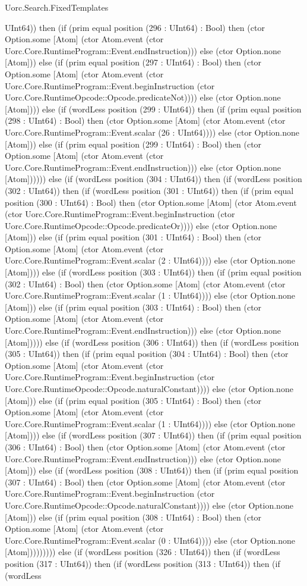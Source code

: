 \begin{lexlean}{Uorc.Search.FixedTemplates}
\begin{semanticmodule}
{UInt64)) then (if (prim equal position (296 : UInt64) : Bool) then (ctor Option.some [Atom] (ctor Atom.event (ctor Uorc.Core.RuntimeProgram::Event.endInstruction))) else (ctor Option.none [Atom])) else (if (prim equal position (297 : UInt64) : Bool) then (ctor Option.some [Atom] (ctor Atom.event (ctor Uorc.Core.RuntimeProgram::Event.beginInstruction (ctor Uorc.Core.RuntimeOpcode::Opcode.predicateNot)))) else (ctor Option.none [Atom]))) else (if (wordLess position (299 : UInt64)) then (if (prim equal position (298 : UInt64) : Bool) then (ctor Option.some [Atom] (ctor Atom.event (ctor Uorc.Core.RuntimeProgram::Event.scalar (26 : UInt64)))) else (ctor Option.none [Atom])) else (if (prim equal position (299 : UInt64) : Bool) then (ctor Option.some [Atom] (ctor Atom.event (ctor Uorc.Core.RuntimeProgram::Event.endInstruction))) else (ctor Option.none [Atom]))))) else (if (wordLess position (304 : UInt64)) then (if (wordLess position (302 : UInt64)) then (if (wordLess position (301 : UInt64)) then (if (prim equal position (300 : UInt64) : Bool) then (ctor Option.some [Atom] (ctor Atom.event (ctor Uorc.Core.RuntimeProgram::Event.beginInstruction (ctor Uorc.Core.RuntimeOpcode::Opcode.predicateOr)))) else (ctor Option.none [Atom])) else (if (prim equal position (301 : UInt64) : Bool) then (ctor Option.some [Atom] (ctor Atom.event (ctor Uorc.Core.RuntimeProgram::Event.scalar (2 : UInt64)))) else (ctor Option.none [Atom]))) else (if (wordLess position (303 : UInt64)) then (if (prim equal position (302 : UInt64) : Bool) then (ctor Option.some [Atom] (ctor Atom.event (ctor Uorc.Core.RuntimeProgram::Event.scalar (1 : UInt64)))) else (ctor Option.none [Atom])) else (if (prim equal position (303 : UInt64) : Bool) then (ctor Option.some [Atom] (ctor Atom.event (ctor Uorc.Core.RuntimeProgram::Event.endInstruction))) else (ctor Option.none [Atom])))) else (if (wordLess position (306 : UInt64)) then (if (wordLess position (305 : UInt64)) then (if (prim equal position (304 : UInt64) : Bool) then (ctor Option.some [Atom] (ctor Atom.event (ctor Uorc.Core.RuntimeProgram::Event.beginInstruction (ctor Uorc.Core.RuntimeOpcode::Opcode.naturalConstant)))) else (ctor Option.none [Atom])) else (if (prim equal position (305 : UInt64) : Bool) then (ctor Option.some [Atom] (ctor Atom.event (ctor Uorc.Core.RuntimeProgram::Event.scalar (1 : UInt64)))) else (ctor Option.none [Atom]))) else (if (wordLess position (307 : UInt64)) then (if (prim equal position (306 : UInt64) : Bool) then (ctor Option.some [Atom] (ctor Atom.event (ctor Uorc.Core.RuntimeProgram::Event.endInstruction))) else (ctor Option.none [Atom])) else (if (wordLess position (308 : UInt64)) then (if (prim equal position (307 : UInt64) : Bool) then (ctor Option.some [Atom] (ctor Atom.event (ctor Uorc.Core.RuntimeProgram::Event.beginInstruction (ctor Uorc.Core.RuntimeOpcode::Opcode.naturalConstant)))) else (ctor Option.none [Atom])) else (if (prim equal position (308 : UInt64) : Bool) then (ctor Option.some [Atom] (ctor Atom.event (ctor Uorc.Core.RuntimeProgram::Event.scalar (0 : UInt64)))) else (ctor Option.none [Atom])))))))) else (if (wordLess position (326 : UInt64)) then (if (wordLess position (317 : UInt64)) then (if (wordLess position (313 : UInt64)) then (if (wordLess }
\end{semanticmodule}
\end{lexlean}
